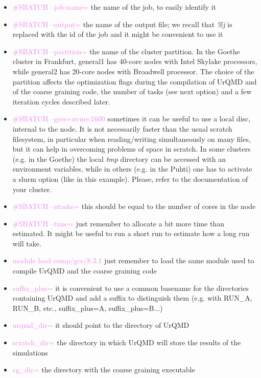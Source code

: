 \documentclass[12pt, a4paper]{article}
\begin{document}
\begin{itemize}
	\item \textcolor{Violet}{\#SBATCH --job-name=} the name of the job, to easily identify it
	\item \textcolor{Violet}{\#SBATCH --output=} the name of the output file; we recall that \emph{\%j} is replaced with the id of the job and it might be convenient to use it	
	\item \textcolor{Violet}{\#SBATCH --partition=} the name of the cluster partition. In the Goethe cluster in Frankfurt, general1 has 40-core nodes with Intel Skylake processors, while general2 has 20-core nodes with Broadwell processor. The choice of the partition affects the optimization flags during the compilation of UrQMD and of the coarse graining code, the number of tasks (see next option) and a few iteration cycles described later.
	\item \textcolor{Violet}{\#SBATCH --gres=nvme:1600} sometimes it can be useful to use a local disc, internal to the node. It is not necessarily faster than the usual scratch filesystem, in particular when reading/writing simultaneously on many files, but it can help in overcoming problems of space in scratch. In some clusters (e.g. in the Goethe) the local \emph{tmp} directory can be accessed with an environment variables, while in others (e.g. in the Puhti) one has to activate a slurm option (like in this example). Please, refer to the documentation of your cluster.
	\item \textcolor{Violet}{\#SBATCH --ntasks=} this should be equal to the number of cores in the node
	\item \textcolor{Violet}{\#SBATCH --time=} just remember to allocate a bit more time than estimated. It might be useful to run a short run to estimate how a long run will take.
	\item \textcolor{Violet}{module load comp/gcc/8.3.1} just remember to load the same module used to compile UrQMD and the coarse graining code
	\item \textcolor{Violet}{suffix\_plus=} it is convenient to use a common basename for the directories containing UrQMD and add a suffix to distinguish them (e.g. with RUN\_A, RUN\_B, etc., suffix\_plus=A, suffix\_plus=B...)
	\item \textcolor{Violet}{urqmd\_dir=} it should point to the directory of UrQMD
	\item \textcolor{Violet}{scratch\_dir=} the directory in which UrQMD will store the results of the simulations
	\item \textcolor{Violet}{cg\_dir=} the directory with the coarse graining executable

\end{itemize}
\end{document}
